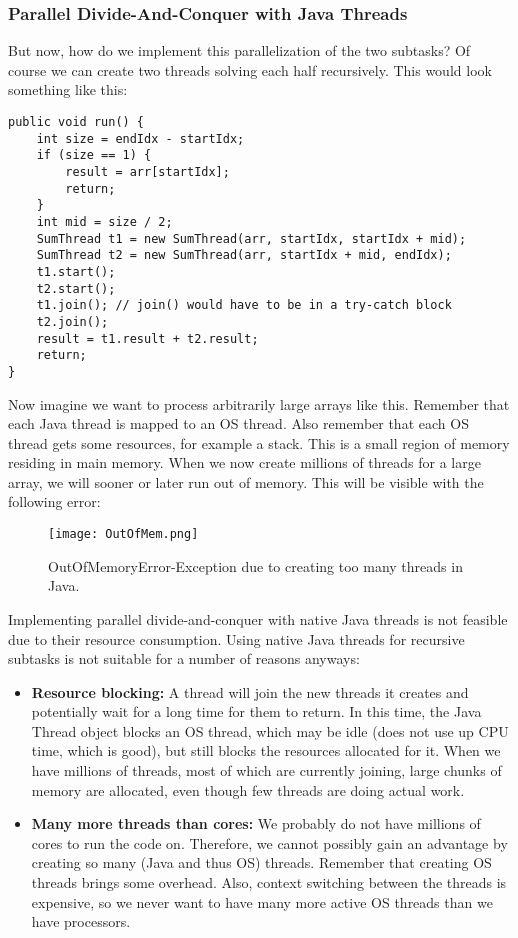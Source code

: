 \documentclass[main.tex]{subfiles}
\begin{document}
\subsubsection{Parallel Divide-And-Conquer with Java Threads}
But now, how do we implement this parallelization of the two subtasks? Of course we can create two threads solving each half recursively. This would look something like this:
\begin{verbatim}
public void run() {
    int size = endIdx - startIdx;
    if (size == 1) {
        result = arr[startIdx];
        return;
    }
    int mid = size / 2;
    SumThread t1 = new SumThread(arr, startIdx, startIdx + mid);
    SumThread t2 = new SumThread(arr, startIdx + mid, endIdx);
    t1.start();
    t2.start();
    t1.join(); // join() would have to be in a try-catch block
    t2.join();
    result = t1.result + t2.result;
    return;
}
\end{verbatim}
\noindent Now imagine we want to process arbitrarily large arrays like this. Remember that each Java thread is mapped to an OS thread. Also remember that each OS thread gets some resources, for example a stack. This is a small region of memory residing in main memory. When we now create millions of threads for a large array, we will sooner or later run out of memory. This will be visible with the following error:

\begin{figure}[H]
    \centering
    \texttt{[image: OutOfMem.png]}
    \caption{OutOfMemoryError-Exception due to creating too many threads in Java.}
\end{figure}

\noindent Implementing parallel divide-and-conquer with native Java threads is not feasible due to their resource consumption. Using native Java threads for recursive subtasks is not suitable for a number of reasons anyways:

\begin{itemize}
  \item \textbf{Resource blocking:} A thread will join the new threads it creates and potentially wait for a long time for them to return. In this time, the Java Thread object blocks an OS thread, which may be idle (does not use up CPU time, which is good), but still blocks the resources allocated for it. When we have millions of threads, most of which are currently joining, large chunks of memory are allocated, even though few threads are doing actual work.
  \item \textbf{Many more threads than cores:} We probably do not have millions of cores to run the code on. Therefore, we cannot possibly gain an advantage by creating so many (Java and thus OS) threads. Remember that creating OS threads brings some overhead. Also, context switching between the threads is expensive, so we never want to have many more active OS threads than we have processors.
\end{itemize}
\end{document}
